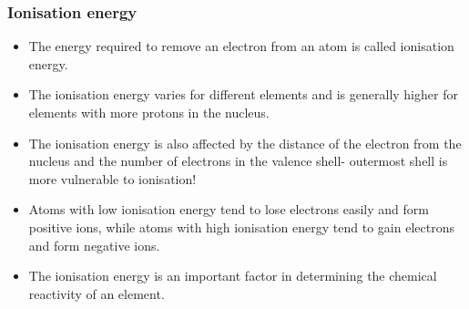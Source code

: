 \begin{frame}
	\frametitle{Ionisation energy}
          \begin{itemize}
            \item The energy required to remove an electron from an atom is called ionisation energy.
            \item The ionisation energy varies for different elements and is generally higher for elements with more protons in the nucleus.
            \item The ionisation energy is also affected by the distance of the electron from the nucleus and the number of electrons in the valence shell- outermost shell is more vulnerable to ionisation!
            \item Atoms with low ionisation energy tend to lose electrons easily and form positive ions, while atoms with high ionisation energy tend to gain electrons and form negative ions.
            \item The ionisation energy is an important factor in determining the chemical reactivity of an element.
          \end{itemize}
\end{frame}



